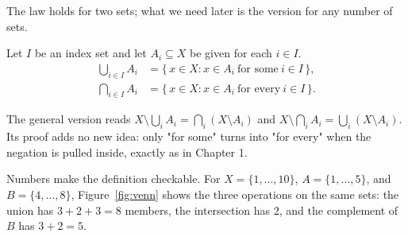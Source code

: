The law holds for two sets; what we need later is the version for any number of sets.

\begin{definisi}
Let $I$ be an index set and let $A_i \subseteq X$ be given for each $i \in I$.
\begin{align*}
  \bigcup_{i \in I} A_i &= \{\, x \in X : x \in A_i \ \text{for some}\ i \in I \,\}, \\
  \bigcap_{i \in I} A_i &= \{\, x \in X : x \in A_i \ \text{for every}\ i \in I \,\}.
\end{align*}
\end{definisi}

The general version reads $X \setminus \bigcup_{i} A_i = \bigcap_{i} (X \setminus A_i)$
and $X \setminus \bigcap_{i} A_i = \bigcup_{i} (X \setminus A_i)$. Its proof adds no
new idea: only "for some" turns into "for every" when the negation is pulled inside,
exactly as in Chapter 1.

Numbers make the definition checkable. For $X = \{1,\dots,10\}$,
$A = \{1,\dots,5\}$, and $B = \{4,\dots,8\}$, Figure~\ref{fig:venn} shows the three
operations on the same sets: the union has $3 + 2 + 3 = 8$ members, the intersection
has $2$, and the complement of $B$ has $3 + 2 = 5$.

